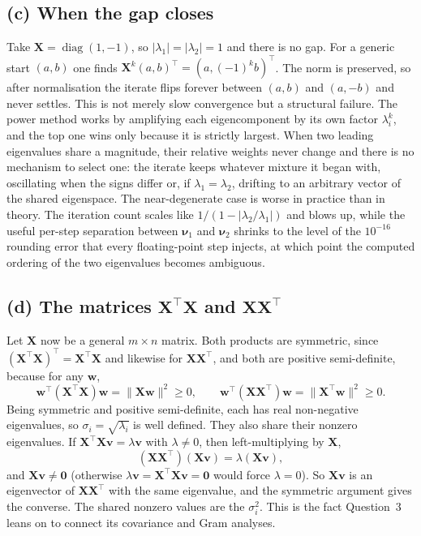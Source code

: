 \documentclass[12pt,a4paper]{article}
\theoremstyle{definition}
\newcommand{\T}{^{\!\top}}
\newcommand{\norm}[1]{\lVert #1 \rVert}
\begin{document}
\subsection{(c) When the gap closes}
Take $\mathbf X=\operatorname{diag}(1,-1)$, so $|\lambda_1|=|\lambda_2|=1$ and there is no gap. For
a generic start $(a,b)$ one finds $\mathbf X^{k}(a,b)\T=(a,(-1)^{k}b)\T$. The norm is preserved, so
after normalisation the iterate flips forever between $(a,b)$ and $(a,-b)$ and never settles. This
is not merely slow convergence but a structural failure. The power method works by amplifying each
eigencomponent by its own factor $\lambda_i^{k}$, and the top one wins only because it is strictly
largest. When two leading eigenvalues share a magnitude, their relative weights never change and
there is no mechanism to select one: the iterate keeps whatever mixture it began with, oscillating
when the signs differ or, if $\lambda_1=\lambda_2$, drifting to an arbitrary vector of the shared
eigenspace. The near-degenerate case is worse in practice than in theory. The iteration count
scales like $1/(1-|\lambda_2/\lambda_1|)$ and blows up, while the useful per-step separation
between $\bm\nu_1$ and $\bm\nu_2$ shrinks to the level of the $10^{-16}$ rounding error that every
floating-point step injects, at which point the computed ordering of the two eigenvalues becomes
ambiguous.

\subsection{(d) The matrices $\mathbf X\T\mathbf X$ and $\mathbf X\mathbf X\T$}
Let $\mathbf X$ now be a general $m\times n$ matrix. Both products are symmetric, since
$(\mathbf X\T\mathbf X)\T=\mathbf X\T\mathbf X$ and likewise for $\mathbf X\mathbf X\T$, and both
are positive semi-definite, because for any $\bm w$,
\begin{equation}
  \bm w\T(\mathbf X\T\mathbf X)\bm w=\norm{\mathbf X\bm w}^{2}\ge0,\qquad
  \bm w\T(\mathbf X\mathbf X\T)\bm w=\norm{\mathbf X\T\bm w}^{2}\ge0 .
\end{equation}
Being symmetric and positive
semi-definite, each has real non-negative eigenvalues, so $\sigma_i=\sqrt{\lambda_i}$ is well
defined. They also share their nonzero eigenvalues. If $\mathbf X\T\mathbf X\bm v=\lambda\bm v$
with $\lambda\neq0$, then left-multiplying by $\mathbf X$,
\begin{equation}
  (\mathbf X\mathbf X\T)(\mathbf X\bm v)=\lambda(\mathbf X\bm v),
\end{equation}
and $\mathbf X\bm v\neq\bm 0$ (otherwise $\lambda\bm v=\mathbf X\T\mathbf X\bm v=\bm 0$ would force
$\lambda=0$). So $\mathbf X\bm v$ is an eigenvector of $\mathbf X\mathbf X\T$ with the same
eigenvalue, and the symmetric argument gives the converse. The shared nonzero values are the
$\sigma_i^{2}$. This is the fact Question~3 leans on to connect its covariance and Gram analyses.
\end{document}
